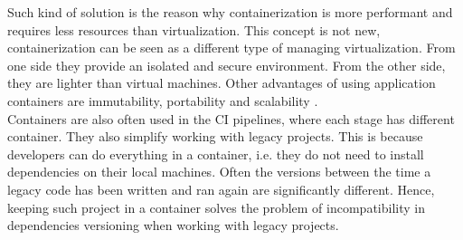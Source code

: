 \documentclass{article} %
\begin{document}
\newline
Such kind of solution is the reason why containerization is more performant and requires less resources than virtualization. This concept is not new, containerization can be seen as a different type of managing virtualization. From one side they provide an isolated and secure environment. From the other side, they are lighter than virtual machines. Other advantages of using application containers are immutability, portability and scalability \cite{bib:containers_features}.\\
\newline
Containers are also often used in the CI pipelines, where each stage has different container. They also simplify working with legacy projects. This is because developers can do everything in a container, i.e. they do not need to install dependencies on their local machines. Often the versions between the time a legacy code has been written and ran again are significantly different. Hence, keeping such project in a container solves the problem of incompatibility in dependencies versioning when working with legacy projects.
\end{document}
